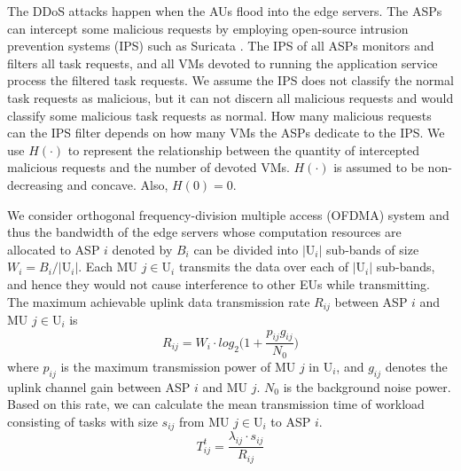 \documentclass[conference]{IEEEtran}
\begin{document}
The DDoS attacks happen when the AUs flood into the edge servers. The ASPs can intercept some malicious requests by employing open-source intrusion prevention systems (IPS) such as Suricata \cite{Suricata}. The IPS of all ASPs monitors and filters all task requests, and all VMs devoted to running the application service process the filtered task requests. We assume the IPS does not classify the normal task requests as malicious, but it can not discern all malicious requests and would classify some malicious task requests as normal. How many malicious requests can the IPS filter depends on how many VMs the ASPs dedicate to the IPS. We use $H(\cdot)$ to represent the relationship between the quantity of intercepted malicious requests and the number of devoted VMs. $H(\cdot)$ is assumed to be non-decreasing and concave. Also, $H(0)=0$.

We consider orthogonal frequency-division multiple access (OFDMA) system and thus the bandwidth of the edge servers whose computation resources are allocated to ASP $i$ denoted by $B_i$ can be divided into $|\mathrm{U}_i|$ sub-bands of size $W_{i} = B_i/|\mathrm{U}_i|$. Each MU $j\in \mathrm{U}_i$ transmits the data over each of $|\mathrm{U}_i|$ sub-bands, and hence they would not cause interference to other EUs while transmitting. The maximum achievable uplink data transmission rate $R_{ij}$ between ASP $i$ and MU $j \in \mathrm{U}_i$ is
\begin{equation} \label{eqn:shannon}
R_{ij}=W_i \cdot log_2\Big(1+\frac{p_{ij}g_{ij}}{N_{0}}\Big)
\end{equation}
where $p_{ij}$ is the maximum transmission power of MU $j$ in $\mathrm{U}_i$, and $g_{ij}$ denotes the uplink channel gain between ASP $i$ and MU $j$. $N_0$ is the background noise power. Based on this rate, we can calculate the mean transmission time of workload consisting of tasks with size $s_{ij}$ from MU $j \in \mathrm{U}_i$ to ASP $i$.
\begin{equation}
T_{ij}^t=\frac{\lambda_{ij} \cdot s_{ij}}{R_{ij}}
\end{equation}
\end{document}

